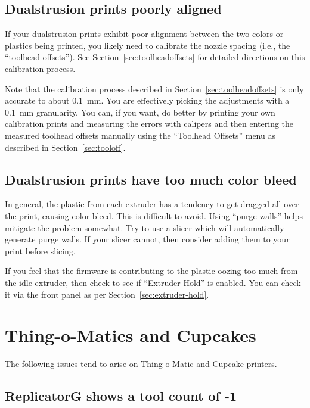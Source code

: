 \subsection{Dualstrusion prints poorly aligned}

If your dualstrusion prints exhibit poor alignment between the two colors
or plastics being printed, you likely need to calibrate the nozzle spacing
(i.e., the ``toolhead offsets'').  See Section~\ref{sec:toolheadoffsets}
for detailed directions on this calibration process.

Note that the calibration process described in Section~\ref{sec:toolheadoffsets}
is only accurate to about 0.1~mm.  You are effectively picking the adjustments
with a 0.1~mm granularity.  You can, if you want, do better by printing your
own calibration prints and measuring the errors with calipers and then entering
the measured toolhead offsets manually using the ``Toolhead Offsets'' menu
as described in Section~\ref{sec:tooloff}.

\subsection{Dualstrusion prints have too much color bleed}

In general, the plastic from each extruder has a tendency to get dragged
all over the print, causing color bleed.  This is difficult to avoid.
Using ``purge walls'' helps mitigate the problem somewhat.  Try to use
a slicer which will automatically generate purge walls.  If your slicer
cannot, then consider adding them to your print before slicing.

If you feel that the firmware is contributing to the plastic oozing too
much from the idle extruder, then check to see if ``Extruder Hold'' is
enabled.  You can check it via the front panel as per
Section~\ref{sec:extruder-hold}.


\section{Thing-o-Matics and Cupcakes}

The following issues tend to arise on Thing-o-Matic and Cupcake printers.

\subsection{ReplicatorG shows a tool count of -1}

